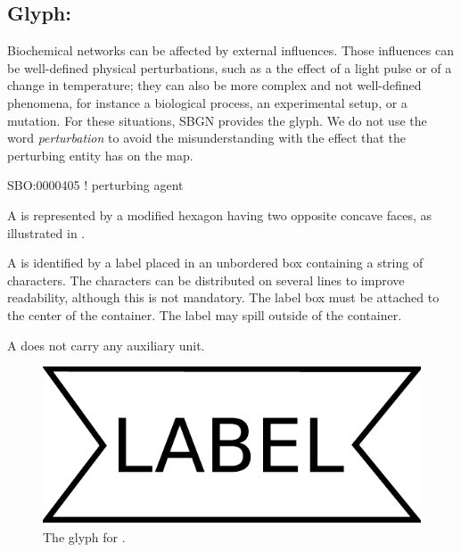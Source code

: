 \color{red}

\subsection{Glyph: }
\label{sec:perturbation}
 
Biochemical networks can be affected by external influences.  Those
influences can be well-defined physical perturbations, such as a the effect of a light
pulse or of a change in temperature; they can also be more complex and not
well-defined phenomena, for instance a biological process, an experimental
setup, or a mutation.  For these situations, SBGN provides the
 glyph. We do not use the word \emph{perturbation} to avoid the misunderstanding with the effect that the perturbing entity has on the map. 

\begin{glyphDescription}

\glyphSboTerm SBO:0000405 ! perturbing agent

\glyphContainer A  is represented by a modified hexagon
having two opposite concave faces, as illustrated in .

\glyphLabel A  is identified by a label placed in an
unbordered box containing a string of characters.  The characters can be
distributed on several lines to improve readability, although this is not
mandatory.  The label box must be attached to the center of the
 container.  The label may spill outside of the container.

\glyphAux A  does not carry any auxiliary unit.

\end{glyphDescription}

\begin{figure}[H]
  \centering
  \includegraphics[scale = 0.3]{images/perturbation}
  \caption{The \ER glyph for .}
  \label{fig:perturbation}
\end{figure}

\normalcolor
